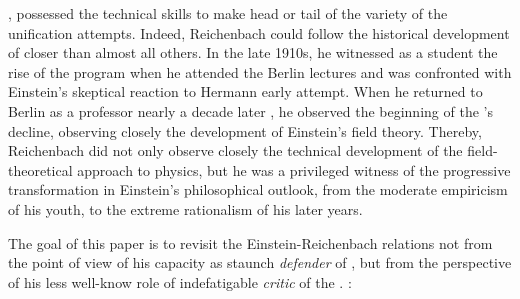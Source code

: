 \documentclass[draft]{article}
\newcommand{\FP}{\german{Fernparallelismus}\xspace}
\begin{document}
%


, possessed the technical skills to make head or tail of the variety of the unification attempts. Indeed, Reichenbach could follow the historical development of \uftp closer than almost all others. In the late 1910s, he witnessed as a student the rise of the program when he attended the Berlin lectures and was confronted with Einstein's skeptical reaction to Hermann  early attempt. When he returned to Berlin as a professor nearly a decade later , he observed the beginning of the \uftp's decline, observing closely the development of Einstein's \FP field theory. Thereby, Reichenbach did not only observe closely the technical development of the field-theoretical approach to physics, but he was a privileged witness of the progressive transformation in Einstein's philosophical outlook, from the moderate empiricism of his youth, to the extreme rationalism of his later years.

The goal of this paper is to revisit the Einstein-Reichenbach relations not from the point of view of his capacity as staunch \emph{defender} of \rt \cite{Hentschel1982}, but from the perspective of his less well-know role of indefatigable \emph{critic} of the \uftp. :
\end{document}

